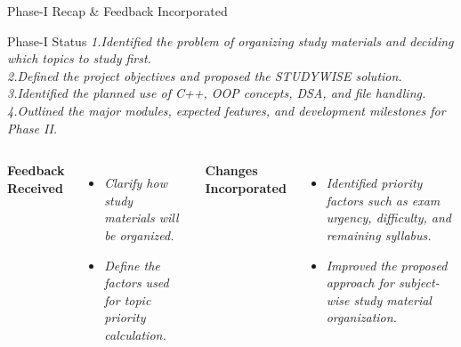 \documentclass[aspectratio=169,11pt]{beamer}
\newcommand{\placeholder}[1]{%
\textit{\color{GEUGrey}#1}
}
\begin{document}
\begin{frame}{Phase-I Recap \& Feedback Incorporated}
\vspace{-6mm}
\begin{block}{Phase-I Status}
\placeholder{1.Identified the problem of organizing study materials and deciding which topics to study first.\\
2.Defined the project objectives and proposed the STUDYWISE solution.\\
3.Identified the planned use of C++, OOP concepts, DSA, and file handling.\\
4.Outlined the major modules, expected features, and development milestones for Phase II.
}
\end{block}

\vspace{0.1mm}

\begin{columns}[T,totalwidth=\textwidth]


\textbf{\color{GEUBlue}Feedback Received}

\begin{itemize}\itemsep2pt
\item \placeholder{Clarify how study materials will be organized.}
\item \placeholder{Define the factors used for topic priority calculation.}

\end{itemize}


\textbf{\color{GEUBlue}Changes Incorporated}

\begin{itemize}\itemsep2pt
\item \placeholder{Identified priority factors such as exam urgency, difficulty, and remaining syllabus.}


\item \placeholder{Improved the proposed approach for subject-wise study material organization.}
\end{itemize}

\end{columns}

\vfill



\end{frame}
\end{document}
